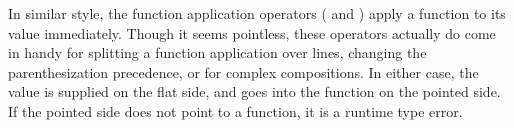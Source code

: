 In similar style, the function application operators (\op{<|} and \op{|>}) apply
a function to its value immediately. Though it seems pointless, these operators
actually do come in handy for splitting a function application over lines, changing
the parenthesization precedence, or for complex compositions. In either case, the
value is supplied on the flat side, and goes into the function on the pointed side.
If the pointed side does not point to a function, it is a runtime type error.

\begin{prooftree}
\end{prooftree}

\begin{prooftree}
\end{prooftree}
